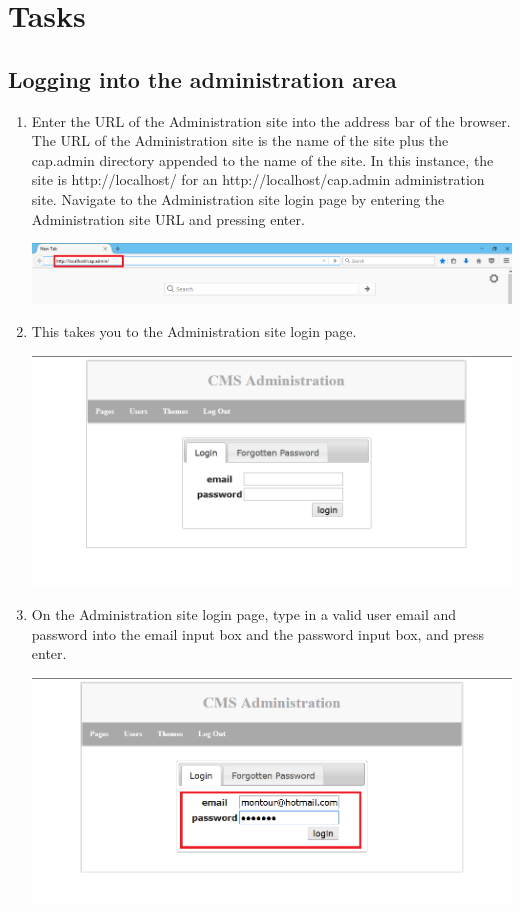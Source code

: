 \documentclass[12pt]{article}
\begin{document}
\section{Tasks}

\subsection{Logging into the administration area}

\begin{enumerate}
  \item Enter the URL of the Administration site into the address bar of the browser. The URL of the Administration site is the name of the site plus the cap.admin directory appended to the name of the site. In this instance, the site is http://localhost/ for an http://localhost/cap.admin administration site. Navigate to the Administration site login page by entering the Administration site URL and pressing enter.
  
  \includegraphics[width=\textwidth,height=\textheight,keepaspectratio]{pics/login.png}
  
  \item This takes you to the Administration site login page.
  
  \includegraphics[width=\textwidth,height=\textheight,keepaspectratio]{pics/adminLoginPage.png}
  
  
  \item On the Administration site login page, type in a valid user email and password into the email input box and the password input box, and press enter.
  
  \includegraphics[width=\textwidth,height=\textheight,keepaspectratio]{pics/emailPassword.png}
  

\end{enumerate}
\end{document}

